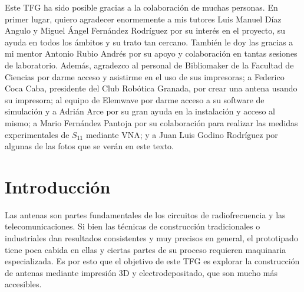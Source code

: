 \documentclass[11pt,a4paper,twoside,pdf]{article}
\numberwithin{equation}{section}
\begin{document}
\begin{center}
\begin{minipage}{\linewidth}
Este TFG ha sido posible gracias a la colaboración de muchas personas. En primer lugar, quiero agradecer enormemente a mis tutores Luis Manuel Díaz Angulo y Miguel Ángel Fernández Rodríguez por su interés en el proyecto, su ayuda en todos los ámbitos y su trato tan cercano. También le doy las gracias a mi mentor Antonio Rubio Andrés por su apoyo y colaboración en tantas sesiones de laboratorio. Además, agradezco al personal de Bibliomaker de la Facultad de Ciencias por darme acceso y asistirme en el uso de sus impresoras; a Federico Coca Caba, presidente del Club Robótica Granada, por crear una antena usando su impresora; al equipo de Elemwave por darme acceso a su software de simulación y a Adrián Arce por su gran ayuda en la instalación y acceso al mismo; a Mario Fernández Pantoja por su colaboración para realizar las medidas experimentales de $S_{11}$ mediante VNA; y a Juan Luis Godino Rodríguez por algunas de las fotos que se verán en este texto.
\end{minipage}

\vfill

\end{center}


\tableofcontents


\newpage

\pagestyle{fancy}
\fancyhead[RO,LE]{\leftmark}
\fancyhead[LO,RE]{\thepage}
\fancyfoot{}

\normalsize

\section{Introducción}

Las antenas son partes fundamentales de los circuitos de radiofrecuencia y las telecomunicaciones. Si bien las técnicas de construcción tradicionales o industriales dan resultados consistentes y muy precisos en general, el prototipado tiene poca cabida en ellas y ciertas partes de su proceso requieren maquinaria especializada. Es por esto que el objetivo de este TFG es explorar la construcción de antenas mediante impresión 3D y electrodepositado, que son mucho más accesibles. \\
\end{document}
